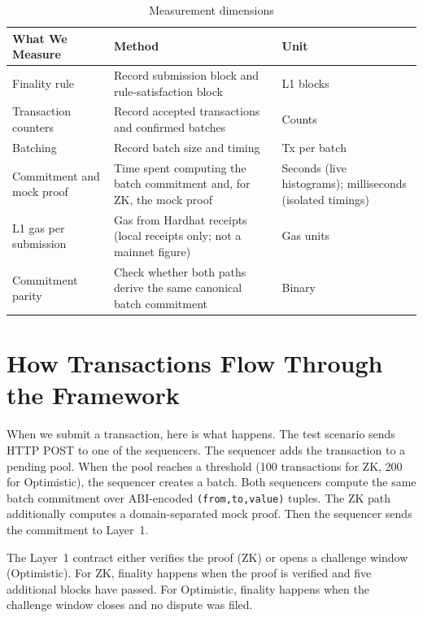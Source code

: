 \begin{table}[htbp]
    \centering
    \small
    \setlength{\tabcolsep}{4pt}
    \begin{tabular}{>{\raggedright\arraybackslash}p{3.0cm}|>{\raggedright\arraybackslash}p{6.0cm}|>{\raggedright\arraybackslash}p{3.0cm}}
        \hline
        \textbf{What We Measure} & \textbf{Method} & \textbf{Unit} \\
        \hline
        Finality rule & Record submission block and rule-satisfaction block & L1 blocks \\
        \hline
        Transaction counters & Record accepted transactions and confirmed batches & Counts \\
        \hline
        Batching & Record batch size and timing & Tx per batch \\
        \hline
        Commitment and mock proof & Time spent computing the batch commitment and, for ZK, the mock proof & Seconds (live histograms); milliseconds (isolated timings) \\
        \hline
        L1 gas per submission & Gas from Hardhat receipts (local receipts only; not a mainnet figure) & Gas units \\
        \hline
        Commitment parity & Check whether both paths derive the same canonical batch commitment & Binary \\
        \hline
    \end{tabular}
    \caption{Measurement dimensions}
    \label{tab:eval-dimensions}
\end{table}

\section{How Transactions Flow Through the Framework}

When we submit a transaction, here is what happens. The test scenario sends HTTP POST to one of the sequencers. The sequencer adds the transaction to a pending pool. When the pool reaches a threshold (100 transactions for ZK, 200 for Optimistic), the sequencer creates a batch. Both sequencers compute the same batch commitment over ABI-encoded \texttt{(from,to,value)} tuples. The ZK path additionally computes a domain-separated mock proof. Then the sequencer sends the commitment to Layer~1.

The Layer~1 contract either verifies the proof (ZK) or opens a challenge window (Optimistic). For ZK, finality happens when the proof is verified and five additional blocks have passed. For Optimistic, finality happens when the challenge window closes and no dispute was filed.

